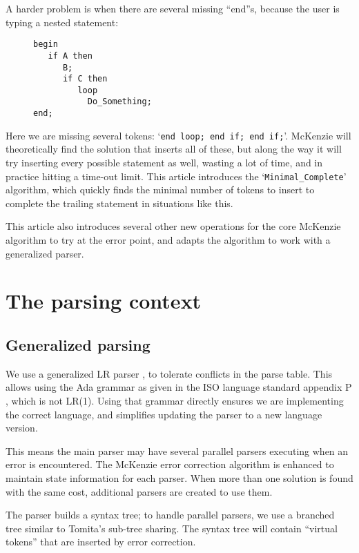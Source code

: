 \documentclass{article}
\newcommand{\code}[1]{`{\tt #1}'}
\begin{document}
A harder problem is when there are several missing ``end''s, because
the user is typing a nested statement:
\begin{figure}[H]
\begin{verbatim}
begin
   if A then
      B;
      if C then
         loop
           Do_Something;
end;
\end{verbatim}
\caption{}
\label{ex:min_com_if_if_loop}
\end{figure}

Here we are missing several tokens: \code{end loop; end if; end if;}.
McKenzie will theoretically find the solution that inserts all of
these, but along the way it will try inserting every possible
statement as well, wasting a lot of time, and in practice hitting a
time-out limit. This article introduces the \code{Minimal\_Complete}
algorithm, which quickly finds the minimal number of tokens to insert
to complete the trailing statement in situations like this.

This article also introduces several other new operations for the core
McKenzie algorithm to try at the error point, and adapts the algorithm
to work with a generalized parser.


\section{The parsing context}
\subsection{Generalized parsing}
We use a generalized LR parser \cite{Tomita 1986}, to tolerate
conflicts in the parse table. This allows using the Ada grammar as
given in the ISO language standard appendix P \cite{Ada 2012}, which
is not LR(1). Using that grammar directly ensures we are implementing
the correct language, and simplifies updating the parser to a new
language version.

This means the main parser may have several parallel parsers executing
when an error is encountered. The McKenzie error correction algorithm
is enhanced to maintain state information for each parser. When more
than one solution is found with the same cost, additional parsers are
created to use them.

The parser builds a syntax tree; to handle parallel parsers, we use a
branched tree similar to Tomita's sub-tree sharing. The syntax tree
will contain ``virtual tokens'' that are inserted by error correction.
\end{document}

